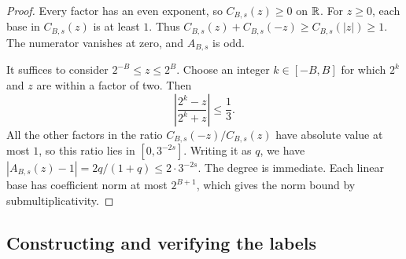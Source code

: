 \begin{proof}
Every factor has an even exponent, so $C_{B,s}(z)\ge0$ on $\mathbb R$.
For $z\ge0$, each base in $C_{B,s}(z)$ is at least $1$.
Thus $C_{B,s}(z)+C_{B,s}(-z)\ge C_{B,s}(|z|)\ge1$.
The numerator vanishes at zero, and $A_{B,s}$ is odd.

It suffices to consider $2^{-B}\le z\le2^B$.  Choose an integer
$k\in[-B,B]$ for which $2^k$ and $z$ are within a factor of two.
Then
\[
 \left|\frac{2^k-z}{2^k+z}\right|\le\frac13.
\]
All the other factors in the ratio $C_{B,s}(-z)/C_{B,s}(z)$ have
absolute value at most $1$, so this ratio lies in $[0,3^{-2s}]$.
Writing it as $q$, we have
$|A_{B,s}(z)-1|=2q/(1+q)\le2\cdot3^{-2s}$.
The degree is immediate.  Each linear base has coefficient norm at most
$2^{B+1}$, which gives the norm bound by submultiplicativity.
\end{proof}

\subsection{Constructing and verifying the labels}

